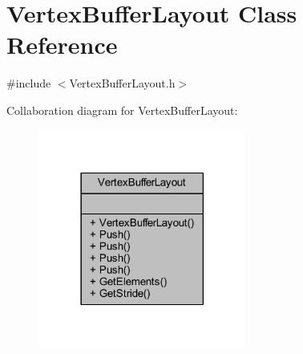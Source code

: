 \hypertarget{class_vertex_buffer_layout}{}\section{Vertex\+Buffer\+Layout Class Reference}
\label{class_vertex_buffer_layout}


{\ttfamily \#include $<$Vertex\+Buffer\+Layout.\+h$>$}



Collaboration diagram for Vertex\+Buffer\+Layout\+:
\nopagebreak
\begin{figure}[H]
\begin{center}
\leavevmode
\includegraphics[width=194pt]{class_vertex_buffer_layout__coll__graph}
\end{center}
\end{figure}
